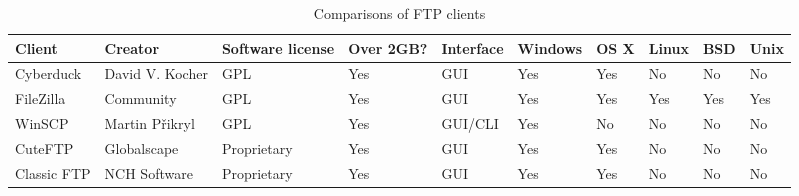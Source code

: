 \documentclass[9pt,twocolumn,twoside]{styles/osajnl}
\begin{document}
\begin{table}[hbt]
\centering


\begin{tabular}{|l|l|l|l|l|l|l|l|l|l|}
\hline
\rowcolor[HTML]{D9F4F4} 
\textbf{Client} & \textbf{Creator}         & \textbf{Software license} & \textbf{Over 2GB?} & \textbf{Interface} & \textbf{Windows} & \textbf{OS X} & \textbf{Linux} & \textbf{BSD} & \textbf{Unix} \\ \hline
Cyberduck       & David V. Kocher          & GPL                       & Yes                & GUI                & Yes              & Yes           & No             & No           & No            \\ \hline
FileZilla       & Community                & GPL                       & Yes                & GUI                & Yes              & Yes           & Yes            & Yes          & Yes           \\ \hline
WinSCP          & Martin Přikryl           & GPL                       & Yes                & GUI/CLI            & Yes              & No            & No             & No           & No            \\ \hline
CuteFTP         &Globalscape & Proprietary               & Yes                & GUI                & Yes              & Yes           & No             & No           & No            \\ \hline
Classic FTP     & NCH Software             & Proprietary               & Yes                & GUI                & Yes              & Yes           & No             & No           & No            \\ \hline
\end{tabular}
\caption{Comparisons of FTP clients \cite{www-wiki-perf}}
\label{perf}
\end{table}
\end{document}
